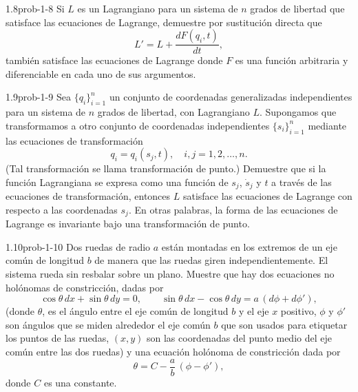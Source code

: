 \begin{problema}{1.8}{prob-1-8}
Si $L$ es un Lagrangiano para un sistema de $n$ grados de libertad que satisface las ecuaciones de Lagrange, demuestre por sustitución directa que
\[
L' = L + \frac{dF(q_i,t)}{dt},
\]
también satisface las ecuaciones de Lagrange donde $F$ es una función arbitraria y diferenciable en cada uno de sus argumentos.
\end{problema}

\begin{problema}{1.9}{prob-1-9}
Sea $\{q_i\}_{i=1}^{n}$ un conjunto de coordenadas generalizadas independientes para un sistema de $n$ grados de libertad, con Lagrangiano $L$. Supongamos que transformamos a otro conjunto de coordenadas independientes $\{s_i\}_{i=1}^{n}$ mediante las ecuaciones de transformación
\[
q_i = q_i(s_j,t), \quad i,j = 1,2,\ldots,n.
\]
(Tal transformación se llama transformación de punto.) Demuestre que si la función Lagrangiana se expresa como una función de $s_j$, $\dot s_j$ y $t$ a través de las ecuaciones de transformación, entonces $L$ satisface las ecuaciones de Lagrange con respecto a las coordenadas $s_j$. En otras palabras, la forma de las ecuaciones de Lagrange es invariante bajo una transformación de punto.
\end{problema}

\begin{problema}{1.10}{prob-1-10}
Dos ruedas de radio $a$ están montadas en los extremos de un eje común de longitud $b$ de manera que las ruedas giren independientemente. El sistema rueda sin resbalar sobre un plano. Muestre que hay dos ecuaciones no holónomas de constricción, dadas por
\[
\cos\theta\,dx + \sin\theta\,dy = 0,\qquad
\sin\theta\,dx - \cos\theta\,dy = a\,(d\phi + d\phi'),
\]
(donde $\theta$, es el ángulo entre el eje común de longitud $b$ y el eje $x$ positivo, $\phi$ y $\phi'$ son ángulos que se miden alrededor el eje común $b$ que son usados para etiquetar los puntos de las ruedas, $(x,y)$ son las coordenadas del punto medio del eje común entre las dos ruedas) y una ecuación holónoma de constricción dada por
\[
\theta = C - \frac{a}{b}\,(\phi - \phi'),
\]
donde $C$ es una constante.
\end{problema}


